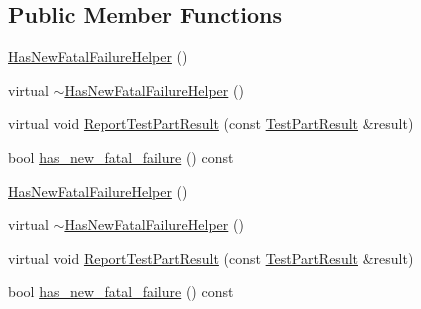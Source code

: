 \subsection*{Public Member Functions}
\begin{DoxyCompactItemize}
\item 
\hyperlink{classtesting_1_1internal_1_1_has_new_fatal_failure_helper_a59190a7188db558c00b4c6bf9251859a}{Has\-New\-Fatal\-Failure\-Helper} ()
\item 
virtual \hyperlink{classtesting_1_1internal_1_1_has_new_fatal_failure_helper_a913b1bc7c372868c9b2dbb009044ee97}{$\sim$\-Has\-New\-Fatal\-Failure\-Helper} ()
\item 
virtual void \hyperlink{classtesting_1_1internal_1_1_has_new_fatal_failure_helper_a2d2e1faa1f3669b82810df97ac678a27}{Report\-Test\-Part\-Result} (const \hyperlink{classtesting_1_1_test_part_result}{Test\-Part\-Result} \&result)
\item 
bool \hyperlink{classtesting_1_1internal_1_1_has_new_fatal_failure_helper_ae137e639098071f11f531bbd72dde1c7}{has\-\_\-new\-\_\-fatal\-\_\-failure} () const 
\item 
\hyperlink{classtesting_1_1internal_1_1_has_new_fatal_failure_helper_a59190a7188db558c00b4c6bf9251859a}{Has\-New\-Fatal\-Failure\-Helper} ()
\item 
virtual \hyperlink{classtesting_1_1internal_1_1_has_new_fatal_failure_helper_ae9207df58c9ca17b8243b6b664b402fa}{$\sim$\-Has\-New\-Fatal\-Failure\-Helper} ()
\item 
virtual void \hyperlink{classtesting_1_1internal_1_1_has_new_fatal_failure_helper_ac7b5e77c9847b2b057cb97193ba82441}{Report\-Test\-Part\-Result} (const \hyperlink{classtesting_1_1_test_part_result}{Test\-Part\-Result} \&result)
\item 
bool \hyperlink{classtesting_1_1internal_1_1_has_new_fatal_failure_helper_ae137e639098071f11f531bbd72dde1c7}{has\-\_\-new\-\_\-fatal\-\_\-failure} () const 
\end{DoxyCompactItemize}



